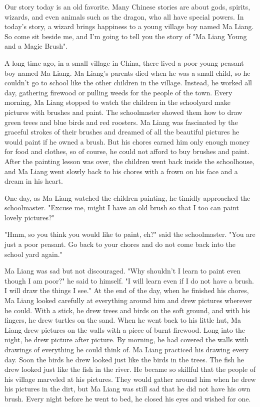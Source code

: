 Our story today is an old favorite. Many Chinese stories are about gods, spirits, wizards, and even animals such as the dragon, who all have special powers. In today's story, a wizard brings happiness to a young village boy named Ma Liang. So come sit beside me, and I'm going to tell you the story of "Ma Liang Young and a Magic Brush".

A long time ago, in a small village in China, there lived a poor young peasant boy named Ma Liang. Ma Liang's parents died when he was a small child, so he couldn't go to school like the other children in the village. Instead, he worked all day, gathering firewood or pulling weeds for the people of the town. Every morning, Ma Liang stopped to watch the children in the schoolyard make pictures with brushes and paint. The schoolmaster showed them how to draw green trees and blue birds and red roosters. Ma Liang was fascinated by the graceful strokes of their brushes and dreamed of all the beautiful pictures he would paint if he owned a brush. But his chores earned him only enough money for food and clothes, so of course, he could not afford to buy brushes and paint. After the painting lesson was over, the children went back inside the schoolhouse, and Ma Liang went slowly back to his chores with a frown on his face and a dream in his heart.

One day, as Ma Liang watched the children painting, he timidly approached the schoolmaster. "Excuse me, might I have an old brush so that I too can paint lovely pictures?"

"Hmm, so you think you would like to paint, eh?" said the schoolmaster. "You are just a poor peasant. Go back to your chores and do not come back into the school yard again."

Ma Liang was sad but not discouraged. "Why shouldn't I learn to paint even though I am poor?" he said to himself. "I will learn even if I do not have a brush. I will draw the things I see." At the end of the day, when he finished his chores, Ma Liang looked carefully at everything around him and drew pictures wherever he could. With a stick, he drew trees and birds on the soft ground, and with his fingers, he drew turtles on the sand. When he went back to his little hut, Ma Liang drew pictures on the walls with a piece of burnt firewood. Long into the night, he drew picture after picture. By morning, he had covered the walls with drawings of everything he could think of. Ma Liang practiced his drawing every day. Soon the birds he drew looked just like the birds in the trees. The fish he drew looked just like the fish in the river. He became so skillful that the people of his village marveled at his pictures. They would gather around him when he drew his pictures in the dirt, but Ma Liang was still sad that he did not have his own brush. Every night before he went to bed, he closed his eyes and wished for one.

